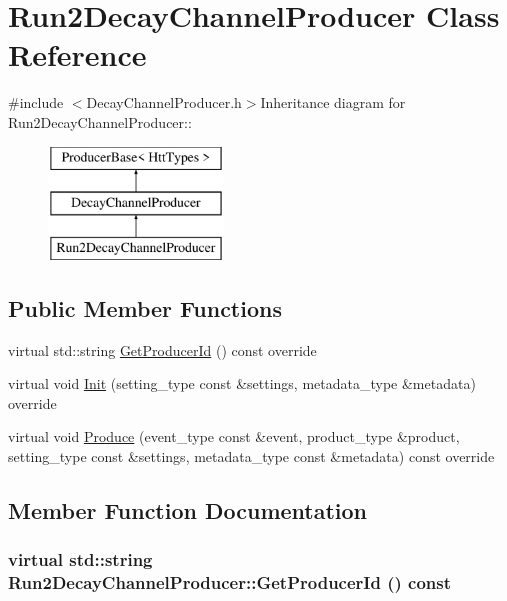 \hypertarget{classRun2DecayChannelProducer}{
\section{Run2DecayChannelProducer Class Reference}
\label{classRun2DecayChannelProducer}
}


{\ttfamily \#include $<$DecayChannelProducer.h$>$}Inheritance diagram for Run2DecayChannelProducer::\begin{figure}[H]
\begin{center}
\leavevmode
\includegraphics[height=3cm]{classRun2DecayChannelProducer}
\end{center}
\end{figure}
\subsection*{Public Member Functions}
\begin{DoxyCompactItemize}
\item 
virtual std::string \hyperlink{classRun2DecayChannelProducer_a06679779125c72055f17b6459ed6cd76}{GetProducerId} () const override
\item 
virtual void \hyperlink{classRun2DecayChannelProducer_a882927f7f4db3244af175db88535a496}{Init} (setting\_\-type const \&settings, metadata\_\-type \&metadata) override
\item 
virtual void \hyperlink{classRun2DecayChannelProducer_a5f16d982e94c38e4c36e97d842bee5be}{Produce} (event\_\-type const \&event, product\_\-type \&product, setting\_\-type const \&settings, metadata\_\-type const \&metadata) const override
\end{DoxyCompactItemize}


\subsection{Member Function Documentation}
\hypertarget{classRun2DecayChannelProducer_a06679779125c72055f17b6459ed6cd76}{
\subsubsection[{GetProducerId}]{\setlength{\rightskip}{0pt plus 5cm}virtual std::string Run2DecayChannelProducer::GetProducerId () const}}
\label{classRun2DecayChannelProducer_a06679779125c72055f17b6459ed6cd76}


